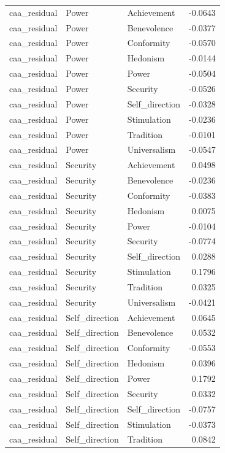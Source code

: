 \begin{tabular}{lllr}
caa\_residual & Power & Achievement & -0.0643 \\
caa\_residual & Power & Benevolence & -0.0377 \\
caa\_residual & Power & Conformity & -0.0570 \\
caa\_residual & Power & Hedonism & -0.0144 \\
caa\_residual & Power & Power & -0.0504 \\
caa\_residual & Power & Security & -0.0526 \\
caa\_residual & Power & Self\_direction & -0.0328 \\
caa\_residual & Power & Stimulation & -0.0236 \\
caa\_residual & Power & Tradition & -0.0101 \\
caa\_residual & Power & Universalism & -0.0547 \\
caa\_residual & Security & Achievement & 0.0498 \\
caa\_residual & Security & Benevolence & -0.0236 \\
caa\_residual & Security & Conformity & -0.0383 \\
caa\_residual & Security & Hedonism & 0.0075 \\
caa\_residual & Security & Power & -0.0104 \\
caa\_residual & Security & Security & -0.0774 \\
caa\_residual & Security & Self\_direction & 0.0288 \\
caa\_residual & Security & Stimulation & 0.1796 \\
caa\_residual & Security & Tradition & 0.0325 \\
caa\_residual & Security & Universalism & -0.0421 \\
caa\_residual & Self\_direction & Achievement & 0.0645 \\
caa\_residual & Self\_direction & Benevolence & 0.0532 \\
caa\_residual & Self\_direction & Conformity & -0.0553 \\
caa\_residual & Self\_direction & Hedonism & 0.0396 \\
caa\_residual & Self\_direction & Power & 0.1792 \\
caa\_residual & Self\_direction & Security & 0.0332 \\
caa\_residual & Self\_direction & Self\_direction & -0.0757 \\
caa\_residual & Self\_direction & Stimulation & -0.0373 \\
caa\_residual & Self\_direction & Tradition & 0.0842 \\

\end{tabular}
